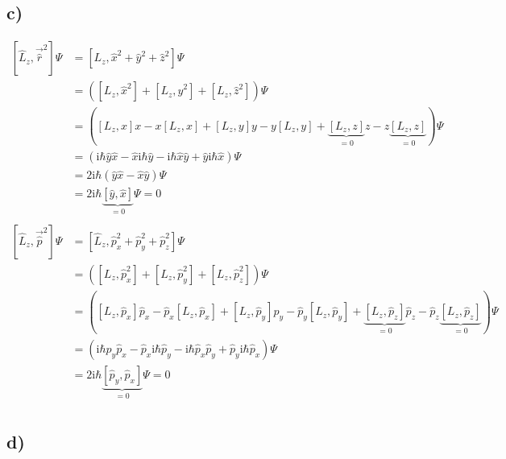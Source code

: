     \subsection{c)}

    \begin{align*}
        \left[ \hat{L}_z,\vec{\hat{r}}^2 \right] \Psi &= [L_z, \hat x ^2 + \hat y ^2 + \hat z ^2] \Psi \\
        &= ([L_z, \hat x ^2 ] + [L_z, \hat y ^2 ] + [L_z, \hat z ^2 ]) \Psi \\
        &= \left( \left[ L_z,x \right]x - x\left[ L_z,x \right] + \left[ L_z,y \right]y - y\left[ L_z,y \right] + \underbrace{\left[ L_z,z \right]}_{=0}z - z\underbrace{\left[ L_z,z \right]}_{=0}\right) \Psi\\
        &= \left( \text{i}\hbar \hat{y}\hat{x} - \hat{x}\text{i}\hbar\hat{y} - \text{i}\hbar \hat{x}\hat{y} + \hat{y}\text{i}\hbar\hat{x} \right) \Psi\\
        &= 2\text{i}\hbar \left( \hat{y}\hat{x}-\hat{x}\hat{y} \right) \Psi\\
        &= 2\text{i}\hbar \underbrace{\left[ \hat{y},\hat{x} \right]}_{=0} \Psi = 0\\
        \\
        \left[ \hat{L}_z,\vec{\hat{p}}^2 \right] \Psi &= [\hat L _z , \hat p _x ^2 + \hat p _y^2 + \hat p _z^2 ] \Psi\\
        &= \left( \left[ L_z,\hat{p}_x ^2 \right] + \left[ L_z,\hat{p}_y ^2 \right] + \left[ L_z,\hat{p}_z ^2 \right] \right)\Psi\\
        &= \left( \left[ L_z,\hat{p}_x \right]\hat{p}_x - \hat{p}_x\left[ L_z,\hat{p}_x \right] + \left[ L_z,\hat{p}_y \right]\hat{p}_y - \hat{p}_y\left[ L_z,\hat{p}_y \right] + \underbrace{\left[ L_z,\hat{p}_z \right]}_{=0}\hat{p}_z - \hat{p}_z\underbrace{\left[ L_z,\hat{p}_z \right]}_{=0}\right) \Psi\\
        &= \left( \text{i}\hbar \hat{p}_y\hat{p}_x - \hat{p}_x\text{i}\hbar\hat{p}_y - \text{i}\hbar \hat{p}_x\hat{p}_y + \hat{p}_y\text{i}\hbar\hat{p}_x \right) \Psi\\
        &= 2\text{i}\hbar \underbrace{\left[ \hat{p}_y,\hat p _x \right]}_{=0} \Psi = 0\\
    \end{align*}

    \subsection{d)}





